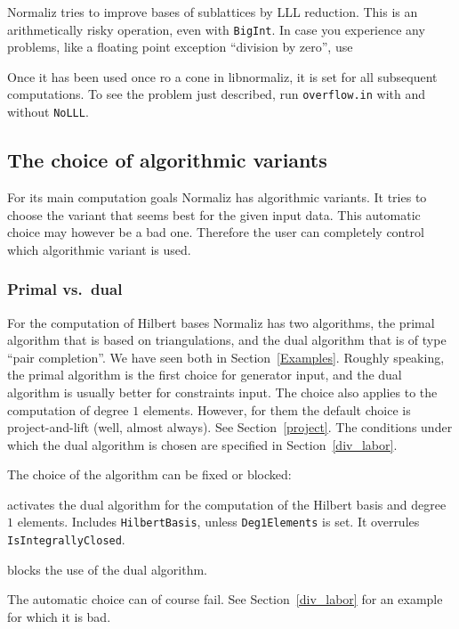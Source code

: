 Normaliz tries to improve bases of sublattices by LLL reduction. This is an arithmetically risky operation, even with \texttt{BigInt}. In case you experience any problems, like a floating point exception ``division by zero'', use 
\begin{itemize}
	\itemtt[NoLLL] 
\end{itemize} 
Once it has been used once ro a cone in libnormaliz, it is set for all subsequent computations. To see the problem just described, run \verb*|overflow.in| with and without \verb*|NoLLL|.

\subsection{The choice of algorithmic variants}

For its main computation goals Normaliz has algorithmic variants. It tries to choose the variant that seems best for the given input data. This automatic choice may however be a bad one. Therefore the user can completely control which algorithmic variant is used.

\subsubsection{Primal vs.\ dual}

For the computation of Hilbert bases Normaliz has two algorithms, the primal algorithm that is based on triangulations, and the dual algorithm that is of type ``pair completion''. We have seen both in Section~\ref{Examples}. Roughly speaking, the primal algorithm is the first choice for generator input, and the dual algorithm is usually better for constraints input. The choice also applies to the computation of degree $1$ elements. However, for them the default choice is project-and-lift (well, almost always). See Section~\ref{project}. The conditions under which the dual algorithm is chosen are specified in Section~\ref{div_labor}.

The choice of the algorithm can be fixed or blocked:
\begin{itemize}
	\itemtt[DualMode, -d] activates the dual algorithm for the computation of the Hilbert basis and degree $1$ elements. Includes \verb|HilbertBasis|, unless \verb|Deg1Elements| is set. It overrules \verb|IsIntegrallyClosed|.
	
	\itemtt[PrimalMode, -P] blocks the use of the dual algorithm.
\end{itemize}

The automatic choice can of course fail. See Section~\ref{div_labor} for an example for which it is bad.

